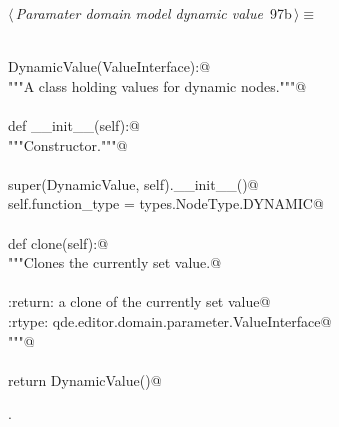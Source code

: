 \documentclass[
    a4paper,      %
    10pt,         %
    openright,    %
    notitlepage,  %
    parskip=half, %
]{scrreprt}       %
\theoremstyle{definition}                    %
\begin{document}
\begin{flushleft} \small
\begin{minipage}{\linewidth}\label{scrap156}\raggedright\small
{} $\langle\,${\itshape Paramater domain model dynamic value}\nobreak\ {\footnotesize {97b}}$\,\rangle\equiv$
\vspace{-1exm}
\begin{list}{}{} \item
\mbox{}\lstinline@@\\
\mbox{}\lstinline@class DynamicValue(ValueInterface):@\\
\mbox{}\lstinline@    """A class holding values for dynamic nodes."""@\\
\mbox{}\lstinline@@\\
\mbox{}\lstinline@    def __init__(self):@\\
\mbox{}\lstinline@        """Constructor."""@\\
\mbox{}\lstinline@@\\
\mbox{}\lstinline@        super(DynamicValue, self).__init__()@\\
\mbox{}\lstinline@        self.function_type = types.NodeType.DYNAMIC@\\
\mbox{}\lstinline@@\\
\mbox{}\lstinline@    def clone(self):@\\
\mbox{}\lstinline@        """Clones the currently set value.@\\
\mbox{}\lstinline@@\\
\mbox{}\lstinline@        :return: a clone of the currently set value@\\
\mbox{}\lstinline@        :rtype:  qde.editor.domain.parameter.ValueInterface@\\
\mbox{}\lstinline@        """@\\
\mbox{}\lstinline@@\\
\mbox{}\lstinline@        return DynamicValue()@{\NWsep}
\end{list}
\vspace{-1.5ex}
\footnotesize
\begin{list}{}{\setlength{\itemsep}{-\parsep}\setlength{\itemindent}{-\leftmargin}}
\item {\NWtxtMacroNoRef}.

\item{}
\end{list}
\end{minipage}\vspace{4ex}
\end{flushleft}
\end{document}
